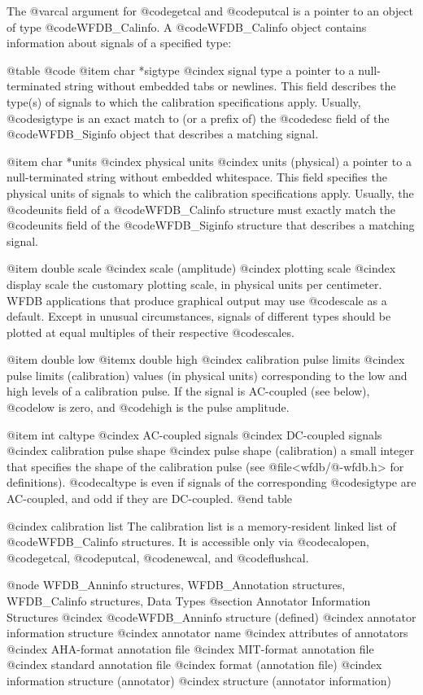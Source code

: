 {{{{{{{{{{The @var{cal} argument for @code{getcal} and @code{putcal} is a pointer
to an object of type @code{WFDB_Calinfo}.  A @code{WFDB_Calinfo} object
contains information about signals of a specified type:

@table @code
@item char *sigtype
@cindex signal type
a pointer to a null-terminated string without embedded tabs or newlines.
This field describes the type(s) of signals to which the calibration
specifications apply.  Usually, @code{sigtype} is an exact match to
(or a prefix of) the @code{desc} field of the @code{WFDB_Siginfo} object
that describes a matching signal.

@item char *units
@cindex physical units
@cindex units (physical)
a pointer to a null-terminated string without embedded whitespace.
This field specifies the physical units of signals to which the
calibration specifications apply.  Usually, the @code{units} field of
a @code{WFDB_Calinfo} structure must exactly match the @code{units} field of
the @code{WFDB_Siginfo} structure that describes a matching signal.

@item double scale
@cindex scale (amplitude)
@cindex plotting scale
@cindex display scale
the customary plotting scale, in physical units per centimeter.  WFDB
applications that produce graphical output may use @code{scale} as a
default.  Except in unusual circumstances, signals of different types
should be plotted at equal multiples of their respective @code{scale}s.

@item double low
@itemx double high
@cindex calibration pulse limits
@cindex pulse limits (calibration)
values (in physical units) corresponding to the low and high levels of
a calibration pulse.  If the signal is AC-coupled (see below),
@code{low} is zero, and @code{high} is the pulse amplitude.

@item int caltype
@cindex AC-coupled signals
@cindex DC-coupled signals
@cindex calibration pulse shape
@cindex pulse shape (calibration)
a small integer that specifies the shape of the calibration pulse (see
@file{<wfdb/@-wfdb.h>} for definitions).  @code{caltype} is even if signals of
the corresponding @code{sigtype} are AC-coupled, and odd if they are
DC-coupled.
@end table

@cindex calibration list
The calibration list is a memory-resident linked list of @code{WFDB_Calinfo}
structures.  It is accessible only via @code{calopen}, @code{getcal},
@code{putcal}, @code{newcal}, and @code{flushcal}.

@node WFDB_Anninfo structures, WFDB_Annotation structures, WFDB_Calinfo structures, Data Types
@section Annotator Information Structures
@cindex @code{WFDB_Anninfo} structure (defined)
@cindex annotator information structure
@cindex annotator name
@cindex attributes of annotators
@cindex AHA-format annotation file
@cindex MIT-format annotation file
@cindex standard annotation file
@cindex format (annotation file)
@cindex information structure (annotator)
@cindex structure (annotator information)

}}}}}}}}}}
